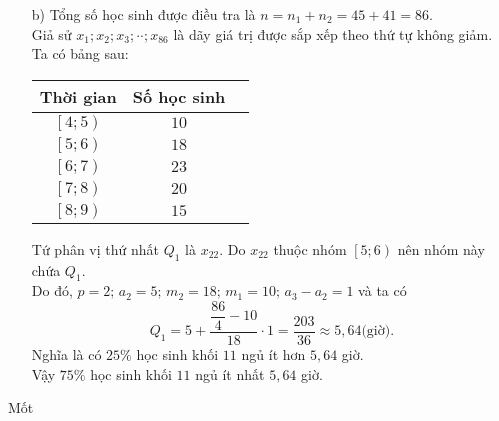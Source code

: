 \begin{bt}
{\begin{enumerate}
			Vì $\overline{x_2}>\overline{x_1}$ nên thời gian ngủ trung bình của các bạn học sinh nữ lớn hơn thời gian ngủ trung bình của các bạn nam.
			\item [b)] Tổng số học sinh được điều tra là $n=n_1+n_2=45+41=86$.\\
			Giả sử $x_1;x_2;x_3;\cdot \cdot;x_{86}$ là dãy giá trị được sắp xếp theo thứ tự không giảm.\\
			Ta có bảng sau:
			\begin{center}
				\begin{tabular}{|c|c|c|}
					\hline
					Thời gian	& Số học sinh \\
					\hline
					$\left[4;5 \right)$	& $10$  \\
					\hline
					$\left[5;6 \right)$	& $18$  \\
					\hline
					$\left[6;7 \right)$	& $23$  \\
					\hline
					$\left[7;8 \right)$	& $20$  \\
					\hline
					$\left[8;9 \right)$	& $15$  \\
					\hline
				\end{tabular}
			\end{center}
			Tứ phân vị thứ nhất $Q_1$ là $x_{22}$. Do $x_{22}$ thuộc nhóm $\left[5;6\right)$ nên nhóm này chứa $Q_1$.\\ Do đó, $p=2;\,a_2=5;\,m_2=18;\,m_1=10;\,a_3-a_2=1$ và ta có
			$$Q_1=5+\dfrac{\dfrac{86}{4}-10}{18}\cdot 1=\dfrac{203}{36}\approx 5{,}64 \text{(giờ)}.$$
			Nghĩa là có $25\%$ học sinh khối $11$ ngủ ít hơn $5{,}64$ giờ.\\ Vậy $75\%$ học sinh khối $11$ ngủ ít nhất $5{,}64$ giờ.
		\end{enumerate}
	}
\end{bt}
\setcounter{subsubsection}{0}
\setcounter{ex}{0}
\setcounter{bt}{0}
\begin{dang}{Mốt}
	
\end{dang}
